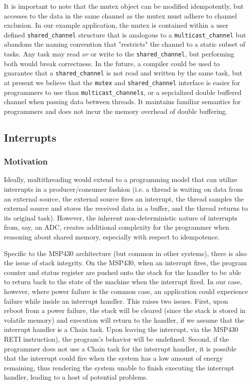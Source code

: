 \documentclass[11pt]{sensys-proc}
\newcommand{\chain}{Chain\xspace}
\begin{document}
It is important to note that the mutex object can be modified idempotently, but
accesses to the data in the same channel as the mutex must adhere to channel
exclusion. In our example application, the mutex is contained within a user
defined \texttt{shared\_channel} structure that is analogous to a
\texttt{multicast\_channel} but abandons the naming convention that "restricts"
the channel to a static subset of tasks. Any task may read {\em or} or write to
the \texttt{shared\_channel}, but performing both would break correctness. In
the future, a compiler could be used to guarantee that a
\texttt{shared\_channel} is not read and written by the same task, but at
present we believe that the \texttt{mutex} and \texttt{shared\_channel}
interface is easier for programmers to use than \texttt{multicast\_channels}, or
a sepcialized double buffered channel when passing data between threads. It
maintains familiar semantics for programmers and does not incur the memory
overhead of double buffering. 

\subsection{Interrupts}
\subsubsection{Motivation}
Ideally, multithreading would extend to a programming model that can utilize
interrupts in a producer/consumer fashion (i.e. a thread is waiting on data
from an external source, the external source fires an interrupt, the thread
samples the external source and stores the received data in a buffer, and
the thread returns to its original task). However, the inherent
non-deterministic
nature of interrupts from, say, an ADC, creates additional complexity for the
programmer when reasoning about shared memory, especially with respect to
idempotence.


    Specific to the MSP430 architecture (but common in other systems), there is
also the issue of stack integrity. On the MSP430, when an interrupt fires,
the program counter and status register are pushed onto the stack for
the handler to be able to return back to the state of the machine when the
interrupt fired. In our case, however, where power failure is the common
case, an application could experience failure while inside an interrupt
handler. This raises two issues. First, upon reboot from a power failure,
the stack will be cleared (since the stack is stored in volatile memory) and
execution will return to the handler, if we assume that the interrupt handler
is a \chain task. Upon leaving the interrupt, via the MSP430 RETI instruction),
the program's behavior will be undefined. Second, if the programmer does not
use a \chain task for the interrupt handler, it is possible that the interrupt
could fire when the system has a low amount of energy remaining, thus
rendering the system unable to finish executing the interrupt handler,
leading to a host of potential problems.
\end{document}
